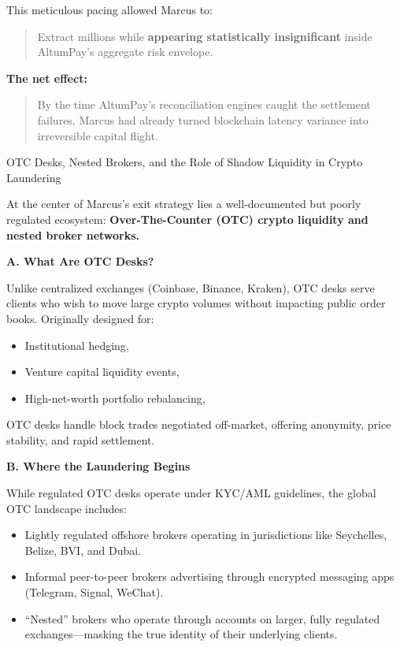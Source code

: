 This meticulous pacing allowed Marcus to:

\begin{quote}
Extract millions while \textbf{appearing statistically insignificant} inside AltumPay’s aggregate risk envelope.
\end{quote}

\medskip

\textbf{The net effect:}

\begin{quote}
By the time AltumPay’s reconciliation engines caught the settlement failures, Marcus had already turned blockchain latency variance into irreversible capital flight.
\end{quote}

\begin{HistoricalSidebar}{OTC Desks, Nested Brokers, and the Role of Shadow Liquidity in Crypto Laundering}

    At the center of Marcus’s exit strategy lies a well-documented but poorly regulated ecosystem:  
    \textbf{Over-The-Counter (OTC) crypto liquidity and nested broker networks.}
    
    \medskip
    
    \textbf{A. What Are OTC Desks?}
    
    Unlike centralized exchanges (Coinbase, Binance, Kraken), OTC desks serve clients who wish to move large crypto volumes without impacting public order books. Originally designed for:
    
    \begin{itemize}
        \item Institutional hedging,
        \item Venture capital liquidity events,
        \item High-net-worth portfolio rebalancing,
    \end{itemize}
    
    OTC desks handle block trades negotiated off-market, offering anonymity, price stability, and rapid settlement.
    
    \medskip
    
    \textbf{B. Where the Laundering Begins}
    
    While regulated OTC desks operate under KYC/AML guidelines, the global OTC landscape includes:
    
    \begin{itemize}
        \item Lightly regulated offshore brokers operating in jurisdictions like Seychelles, Belize, BVI, and Dubai.
        \item Informal peer-to-peer brokers advertising through encrypted messaging apps (Telegram, Signal, WeChat).
        \item “Nested” brokers who operate through accounts on larger, fully regulated exchanges—masking the true identity of their underlying clients.
    \end{itemize}
    

\end{HistoricalSidebar}
